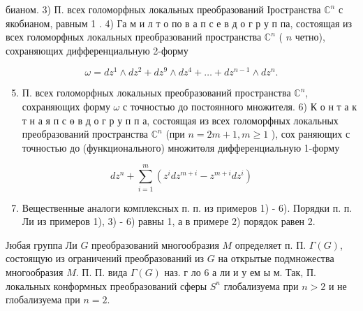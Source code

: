 \documentclass[10pt]{article}
\begin{document}
бианом. 3) П. всех голоморфных локальных преобразований Іространства $\mathbb{C}^{n}$ с якобианом, равным 1 . 4) Га м и л т о по в а п с е в д о г р у п па, состоящая из всех голоморфных локальных преобразований пространства $\mathbb{C}^{n}$ ( $n$ четно), сохраняющих дифференциальную 2-форму



\[

\omega=d z^{1} \wedge d z^{2}+d z^{9} \wedge d z^{4}+\ldots+d z^{n-1} \wedge d z^{n} .

\]



\begin{enumerate}

  \setcounter{enumi}{4}

  \item П. всех голоморфных локальных преобразований пространства $\mathbb{C}^{n}$, сохраняющих форму $\omega$ с точностью до постоянного множителя. 6) К о н т а к т н а я п с ө в д о г р у п п а, состоящая из всех голоморфных локальных преобразований пространства $\mathbb{C}^{n}$ (при $n=2 m+1, m \geqslant 1$ ), сох раняющих с точностью до (функционального) множитөля дифференциальную 1-форму

\end{enumerate}



\[

d z^{n}+\sum_{i=1}^{m}\left(z^{i} d z^{m+i}-z^{m+i} d z^{i}\right)

\]



\begin{enumerate}

  \setcounter{enumi}{6}

  \item Вещественные аналоги комплексных п. п. из примеров 1) - 6). Порядки п. п. Ли из примеров 1), 3) - 6) равны 1, а в примере 2) порядок равен 2.

\end{enumerate}



Јюбая группа Ли $G$ преобразований многообразия $M$ определяет п. П. $\Gamma(G)$, состоящую из ограничений преобразований из $G$ на открытые подмножества многообразия $M$. П. П. вида $\Gamma(G)$ наз. г ло 6 а ли и у ем ы м. Так, П. локальных конформных преобразований сферы $S^{n}$ глобализуема при $n>2$ и не глобализуема при $n=2$.
\end{document}
